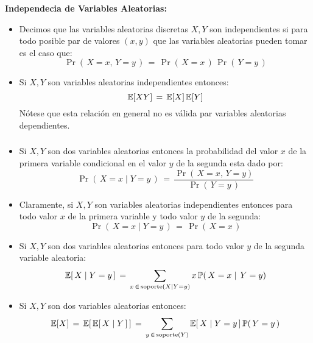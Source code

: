\documentclass[ 10pt, xcolor = dvipsnames]{beamer}
\begin{document}
\begin{frame}[allowframebreaks]
\frametitle{\insertsection}

\textbf{Independecia de Variables Aleatorias:}
\begin{itemize}
\item Decimos que las variables aleatorias discretas $X,Y$ son independientes si \linebreak para todo posible par de valores $(x,y)$ que las variables aleatorias \linebreak pueden tomar es el caso que: 
\[
\Pr( \, X = x, \, Y = y \, ) \, = \,
\Pr( \, X = x \, ) \, \Pr( \, Y = y \, )
\]
\item Si $X,Y$ son variables aleatorias independientes entonces: 
\[
\mathbb{E}[XY] \, = \, \mathbb{E}[X] \, \mathbb{E}[Y]
\]
N\'otese que esta relaci\'on en general no es v\'alida par variables aleatorias dependientes. 
\end{itemize}

\end{frame}

\begin{frame}[allowframebreaks]
\frametitle{\insertsection}

\begin{itemize}
\item Si $X,Y$ son dos variables aleatorias entonces la probabilidad del valor $x$ de la primera variable condicional en el valor $y$ de la segunda esta dado por: 
\[
\Pr( \, X = x \mid Y = y \, ) \, = \, 
\frac{ \Pr( \, X = x, \, Y = y ) }{ \Pr( \, Y = y \, ) }
\]
\item Claramente, si $X,Y$ son variables aleatorias independientes entonces para todo valor $x$ de la primera variable y todo valor $y$ de la segunda: 
\[
\Pr( \, X = x \mid Y = y \, ) \, = \, \Pr( \, X = x \, )
\]
\framebreak
\item Si $X,Y$ son dos variables aleatorias entonces para todo valor $y$ de la \linebreak segunda variable aleatoria: 
\[
\mathbb{E}[ \, X \mid Y  = y \, ] \, = \, \sum_{ x \, \in \, \text{soporte}( X \mid Y = y ) } x \, \mathbb{P}( \, X = x \mid \, Y = y )
\]
\item Si $X,Y$ son dos variables aleatorias entonces: 
\[
\mathbb{E}[X] \, = \, \mathbb{E}[ \, \mathbb{E}[ \, X \mid Y \, ] \, ] \, = \, 
\sum_{ y \, \in \, \text{soporte}(Y) } \mathbb{E}[ \, X \mid Y = y \, ] \,
\mathbb{P}( \, Y = y \, )
\]

\end{itemize}

\end{frame}
\end{document}
